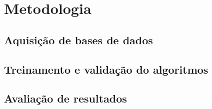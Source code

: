 \documentclass[../main.tex]{subfiles}
\begin{document}
\chapter{Metodologia}


\section{Aquisição de bases de dados}



\section{Treinamento e validação do algoritmos}


\section{Avaliação de resultados}
 
\end{document}
